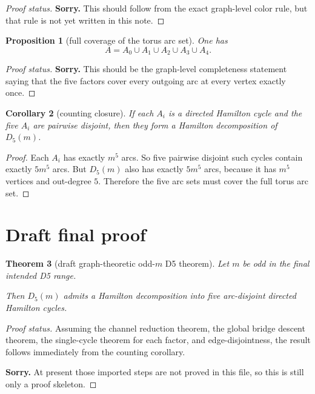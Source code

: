 \documentclass[11pt]{article}
\newtheorem{theorem}{Theorem}[section]
\newtheorem{proposition}[theorem]{Proposition}
\newtheorem{corollary}[theorem]{Corollary}
\begin{document}
\begin{proof}[Proof status]
\textbf{Sorry.} This should follow from the exact graph-level color rule, but
that rule is not yet written in this note.
\end{proof}

\begin{proposition}[full coverage of the torus arc set]
One has
\[
A = A_0 \cup A_1 \cup A_2 \cup A_3 \cup A_4.
\]
\end{proposition}

\begin{proof}[Proof status]
\textbf{Sorry.} This should be the graph-level completeness statement saying
that the five factors cover every outgoing arc at every vertex exactly once.
\end{proof}

\begin{corollary}[counting closure]
If each $A_i$ is a directed Hamilton cycle and the five $A_i$ are pairwise
disjoint, then they form a Hamilton decomposition of $D_5(m)$.
\end{corollary}

\begin{proof}
Each $A_i$ has exactly $m^5$ arcs. So five pairwise disjoint such cycles
contain exactly $5m^5$ arcs. But $D_5(m)$ also has exactly $5m^5$ arcs,
because it has $m^5$ vertices and out-degree $5$. Therefore the five arc sets
must cover the full torus arc set.
\end{proof}

\section{Draft final proof}

\begin{theorem}[draft graph-theoretic odd-$m$ D5 theorem]
Let $m$ be odd in the final intended D5 range.

Then $D_5(m)$ admits a Hamilton decomposition into five arc-disjoint directed
Hamilton cycles.
\end{theorem}

\begin{proof}[Proof status]
Assuming the channel reduction theorem, the global bridge descent theorem, the
single-cycle theorem for each factor, and edge-disjointness, the result follows
immediately from the counting corollary.

\textbf{Sorry.} At present those imported steps are not proved in this file, so
this is still only a proof skeleton.
\end{proof}
\end{document}
